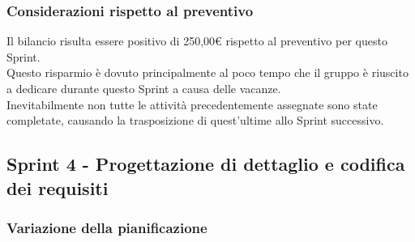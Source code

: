 \subsubsection{Considerazioni rispetto al preventivo} \label{subsubsection:considerazioni_finali_sprint3}
Il bilancio risulta essere positivo di 250,00€ rispetto al preventivo per questo Sprint\glo{}.
\\Questo risparmio è dovuto principalmente al poco tempo che il gruppo è riuscito a dedicare durante questo Sprint\glo{} a causa delle vacanze.
\\Inevitabilmente non tutte le attività precedentemente assegnate sono state completate, causando la trasposizione di quest'ultime allo Sprint\glo{} successivo.


\subsection{Sprint 4 - Progettazione di dettaglio e codifica dei requisiti} \label{subsection:consuntivo_sprint4}
\subsubsection{Variazione della pianificazione} \label{subsubsection:variazione_pianificazione_sprint4}

